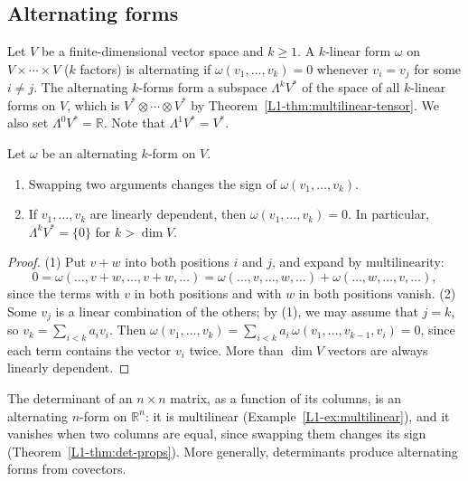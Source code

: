 \subsection{Alternating forms}

\begin{definition}\label{A-def:alternating}
    Let $V$ be a finite-dimensional vector space and $k \geq 1$. A $k$-linear form $\omega$ on $V \times \cdots \times V$ ($k$ factors) is alternating if $\omega(v_1, \ldots, v_k) = 0$ whenever $v_i = v_j$ for some $i \neq j$. The alternating $k$-forms form a subspace $\Lambda^k V^*$ of the space of all $k$-linear forms on $V$, which is $V^* \otimes \cdots \otimes V^*$ by Theorem~\ref{L1-thm:multilinear-tensor}. We also set $\Lambda^0 V^* = \mathbb{R}$. Note that $\Lambda^1 V^* = V^*$.
\end{definition}

\begin{lemma}\label{A-lem:alternating}
    Let $\omega$ be an alternating $k$-form on $V$.
    \begin{enumerate}
        \item Swapping two arguments changes the sign of $\omega(v_1, \ldots, v_k)$.
        \item If $v_1, \ldots, v_k$ are linearly dependent, then $\omega(v_1, \ldots, v_k) = 0$. In particular, $\Lambda^k V^* = \{0\}$ for $k > \dim V$.
    \end{enumerate}
\end{lemma}

\begin{proof}
    (1) Put $v + w$ into both positions $i$ and $j$, and expand by multilinearity:
    \[0 = \omega(\ldots, v + w, \ldots, v + w, \ldots) = \omega(\ldots, v, \ldots, w, \ldots) + \omega(\ldots, w, \ldots, v, \ldots),\]
    since the terms with $v$ in both positions and with $w$ in both positions vanish. (2) Some $v_j$ is a linear combination of the others; by (1), we may assume that $j = k$, so $v_k = \sum_{i < k} a_iv_i$. Then $\omega(v_1, \ldots, v_k) = \sum_{i < k} a_i\,\omega(v_1, \ldots, v_{k-1}, v_i) = 0$, since each term contains the vector $v_i$ twice. More than $\dim V$ vectors are always linearly dependent.
\end{proof}

The determinant of an $n \times n$ matrix, as a function of its columns, is an alternating $n$-form on $\mathbb{R}^n$: it is multilinear (Example~\ref{L1-ex:multilinear}), and it vanishes when two columns are equal, since swapping them changes its sign (Theorem~\ref{L1-thm:det-props}). More generally, determinants produce alternating forms from covectors.

